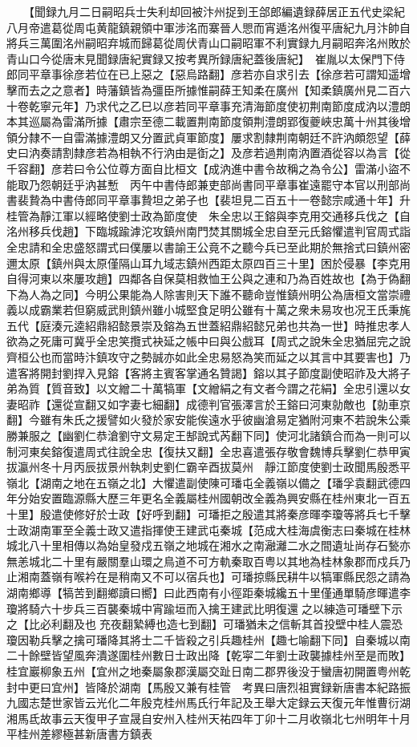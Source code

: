 　　【聞録九月二日嗣昭兵士失利却回被汴州捉到王郃郎編遺録薛居正五代史梁紀八月帝遣葛從周屯黄龍鎮親領中軍涉洺而寨晉人愳而宵遁洺州復平唐紀九月汴帥自將兵三萬圍洺州嗣昭弃城而歸葛從周伏青山口嗣昭軍不利實録九月嗣昭奔洺州敗於青山口今從唐末見聞録唐紀實録又按考異所録唐紀蓋後唐紀】　崔胤以太保門下侍郎同平章事徐彦若位在已上惡之【惡烏路翻】彦若亦自求引去【徐彦若可謂知遥增擊而去之之意者】時藩鎮皆為彊臣所據惟嗣薛王知柔在廣州【知柔鎮廣州見二百六十卷乾寧元年】乃求代之乙巳以彦若同平章事充清海節度使初荆南節度成汭以澧朗本其巡屬為雷滿所據【肅宗至德二載置荆南節度領荆澧朗郢復夔峽忠萬十州其後增領分隸不一自雷滿據澧朗又分置武貞軍節度】屢求割隸荆南朝廷不許汭頗怨望【薛史曰汭奏請割隸彦若為相執不行汭由是衘之】及彦若過荆南汭置酒從容以為言【從千容翻】彦若曰令公位尊方面自比桓文【成汭進中書令故稱之為令公】雷滿小盜不能取乃怨朝廷乎汭甚慙　丙午中書侍郎兼吏部尚書同平章事崔遠罷守本官以刑部尚書裴贄為中書侍郎同平章事贄坦之弟子也【裴坦見二百五十一卷懿宗咸通十年】升桂管為靜江軍以經略使劉士政為節度使　朱全忠以王鎔與李克用交通移兵伐之【自洺州移兵伐趙】下臨城踰滹沱攻鎮州南門焚其關城全忠自至元氏鎔懼遣判官周式詣全忠請和全忠盛怒謂式曰僕屢以書諭王公竟不之聽今兵已至此期於無捨式曰鎮州密邇太原【鎮州與太原僅隔山耳九域志鎮州西距太原四百三十里】困於侵暴【李克用自得河東以來屢攻趙】四鄰各自保莫相救恤王公與之連和乃為百姓故也【為于偽翻下為人為之同】今明公果能為人除害則天下誰不聽命豈惟鎮州明公為唐桓文當崇禮義以成霸業若但窮威武則鎮州雖小城堅食足明公雖有十萬之衆未易攻也况王氏秉旄五代【庭湊元逵紹鼎紹懿景崇及鎔為五世蓋紹鼎紹懿兄弟也共為一世】時推忠孝人欲為之死庸可冀乎全忠笑攬式袂延之帳中曰與公戲耳【周式之說朱全忠猶屈完之說齊桓公也而當時汴鎮攻守之勢誠亦如此全忠易怒為笑而延之以其言中其要害也】乃遣客將開封劉捍入見鎔【客將主賓客掌通名贊謁】鎔以其子節度副使昭祚及大將子弟為質【質音致】以文繒二十萬犒軍【文繒絹之有文者今謂之花絹】全忠引還以女妻昭祚【還從宣翻又如字妻七細翻】成德判官張澤言於王鎔曰河東勍敵也【勍車京翻】今雖有朱氏之援譬如火發於家安能俟遠水乎彼幽滄易定猶附河東不若說朱公乘勝兼服之【幽劉仁恭滄劉守文易定王郜說式芮翻下同】使河北諸鎮合而為一則可以制河東矣鎔復遣周式往說全忠【復扶又翻】全忠喜遣張存敬會魏博兵擊劉仁恭甲寅拔瀛州冬十月丙辰拔景州執刺史劉仁霸辛酉拔莫州　靜江節度使劉士政聞馬殷悉平嶺北【湖南之地在五嶺之北】大懼遣副使陳可璠屯全義嶺以備之【璠孚袁翻武德四年分始安置臨源縣大歷三年更名全義屬桂州國朝改全義為興安縣在桂州東北一百五十里】殷遣使修好於士政【好呼到翻】可璠拒之殷遣其將秦彦暉李瓊等將兵七千擊士政湖南軍至全義士政又遣指揮使王建武屯秦城【范成大桂海虞衡志曰秦城在桂林城北八十里相傳以為始皇發戍五嶺之地城在湘水之南瀜灕二水之間遺址尚存石甃亦無恙城北二十里有嚴關羣山環之鳥道不可方軌秦取百粤以其地為桂林象郡而戍兵乃止湘南蓋嶺有喉衿在是稍南又不可以宿兵也】可璠掠縣民耕牛以犒軍縣民怨之請為湖南鄉導【犒苦到翻鄉讀曰嚮】曰此西南有小徑距秦城纔五十里僅通單騎彦暉遣李瓊將騎六十步兵三百襲秦城中宵踰垣而入擒王建武比明復還之以練造可璠壁下示之【比必利翻及也充夜翻縶縛也造七到翻】可璠猶未之信斬其首投壁中桂人震恐瓊因勒兵擊之擒可璠降其將士二千皆殺之引兵趣桂州【趣七喻翻下同】自秦城以南二十餘壁皆望風奔潰遂圍桂州數日士政出降【乾寜二年劉士政襲據桂州至是而敗】桂宜巖柳象五州【宜州之地秦屬象郡漢屬交趾日南二郡界後没于蠻唐初開置粤州乾封中更曰宜州】皆降於湖南【馬殷又兼有桂管　考異曰唐烈祖實録新唐書本紀路振九國志楚世家皆云光化二年殷克桂州馬氏行年記及王舉大定録云天復元年惟曹衍湖湘馬氐故事云天復甲子宣晟自安州入桂州天祐四年丁卯十二月收嶺北七州明年十月平桂州差繆極甚新唐書方鎮表